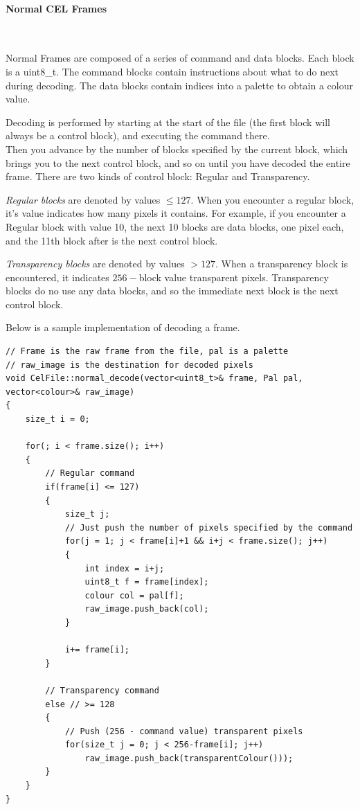 \documentclass[a4paper]{article}
\newcommand{\subsubsubsection}[1] 
{
	\paragraph{#1}
	\mbox{}\\
	
	\noindent
}
\begin{document}
	\subsubsubsection{Normal CEL Frames}
	Normal Frames are composed of a series of command and data blocks.
	Each block is a uint8\_t.
	The command blocks contain instructions about what to do next during decoding. The data blocks contain indices into a palette to obtain a colour value.
	
	Decoding is performed by starting at the start of the file (the first block will always be a control block), and executing the command there. 
	\\Then you advance by the number of blocks specified by the current block, which brings you to the next control block, and so on until you have decoded the entire frame. There are two kinds of control block: Regular and Transparency.
	
	\emph{Regular blocks} are denoted by values $\leq 127$. When you encounter a regular block, it's value indicates how many pixels it contains. For example, if you encounter a Regular block with value 10, the next 10 blocks are data blocks, one pixel each, and the 11th block after is the next control block.
	
	\emph{Transparency blocks} are denoted by values $> 127$. When a transparency block is encountered, it indicates $256-$block value transparent pixels. Transparency blocks do no use any data blocks, and so the immediate next block is the next control block.
	
	Below is a sample implementation of decoding a frame.
	
	\begin{lstlisting}
// Frame is the raw frame from the file, pal is a palette
// raw_image is the destination for decoded pixels
void CelFile::normal_decode(vector<uint8_t>& frame, Pal pal, vector<colour>& raw_image)
{
    size_t i = 0;
    
    for(; i < frame.size(); i++)
    {   
        // Regular command
        if(frame[i] <= 127)
        {    
            size_t j;
            // Just push the number of pixels specified by the command
            for(j = 1; j < frame[i]+1 && i+j < frame.size(); j++)
            {
                int index = i+j;
                uint8_t f = frame[index];
                colour col = pal[f];
                raw_image.push_back(col);
            }
    
            i+= frame[i];
        }

        // Transparency command
        else // >= 128
        {
            // Push (256 - command value) transparent pixels
            for(size_t j = 0; j < 256-frame[i]; j++)
                raw_image.push_back(transparentColour()));
        }
    }
}
	\end{lstlisting}
\end{document}

